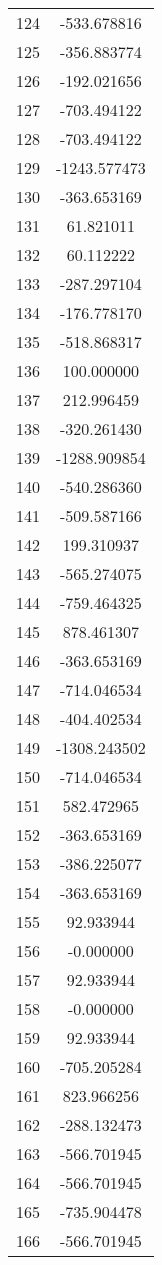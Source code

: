\documentclass[12pt]{article}
\begin{document}
\begin{longtable}{@{}cc@{}}
124 & -533.678816 \\
125 & -356.883774 \\
126 & -192.021656 \\
127 & -703.494122 \\
128 & -703.494122 \\
129 & -1243.577473 \\
130 & -363.653169 \\
131 & 61.821011 \\
132 & 60.112222 \\
133 & -287.297104 \\
134 & -176.778170 \\
135 & -518.868317 \\
136 & 100.000000 \\
137 & 212.996459 \\
138 & -320.261430 \\
139 & -1288.909854 \\
140 & -540.286360 \\
141 & -509.587166 \\
142 & 199.310937 \\
143 & -565.274075 \\
144 & -759.464325 \\
145 & 878.461307 \\
146 & -363.653169 \\
147 & -714.046534 \\
148 & -404.402534 \\
149 & -1308.243502 \\
150 & -714.046534 \\
151 & 582.472965 \\
152 & -363.653169 \\
153 & -386.225077 \\
154 & -363.653169 \\
155 & 92.933944 \\
156 & -0.000000 \\
157 & 92.933944 \\
158 & -0.000000 \\
159 & 92.933944 \\
160 & -705.205284 \\
161 & 823.966256 \\
162 & -288.132473 \\
163 & -566.701945 \\
164 & -566.701945 \\
165 & -735.904478 \\
166 & -566.701945 \\

\end{longtable}
\end{document}
